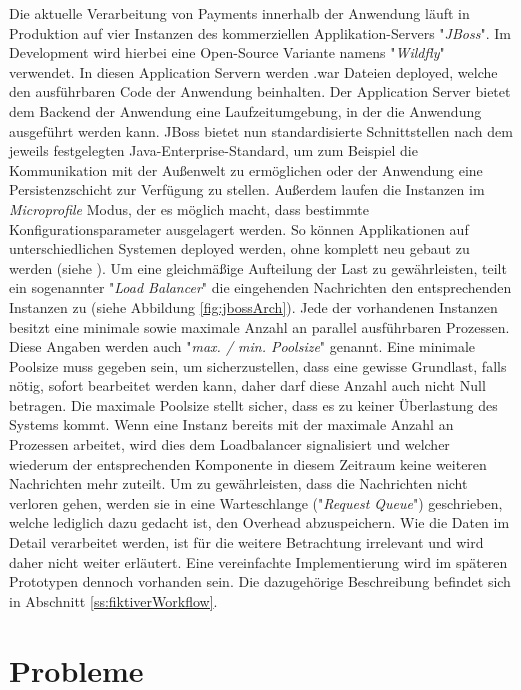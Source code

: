 Die aktuelle Verarbeitung von Payments innerhalb der Anwendung läuft in Produktion auf vier Instanzen des kommerziellen Applikation-Servers "\emph{JBoss}". Im Development wird hierbei eine Open-Source Variante namens "\emph{Wildfly}" verwendet. In diesen Application Servern werden .war Dateien deployed, welche den ausführbaren Code der Anwendung beinhalten. Der Application Server bietet dem Backend der Anwendung eine Laufzeitumgebung, in der die Anwendung ausgeführt werden kann. JBoss bietet nun standardisierte Schnittstellen nach dem jeweils festgelegten Java-Enterprise-Standard, um zum Beispiel die Kommunikation mit der Außenwelt zu ermöglichen oder der Anwendung eine Persistenzschicht zur Verfügung zu stellen. Außerdem laufen die Instanzen im \emph{Microprofile} Modus, der es möglich macht, dass bestimmte Konfigurationsparameter ausgelagert werden. So können Applikationen auf unterschiedlichen Systemen deployed werden, ohne komplett neu gebaut zu werden (siehe \cite{microprofile}). Um eine gleichmäßige Aufteilung der Last zu gewährleisten, teilt ein sogenannter "\emph{Load Balancer}" die eingehenden Nachrichten den entsprechenden Instanzen zu (siehe Abbildung \ref{fig:jbossArch}). Jede der vorhandenen Instanzen besitzt eine minimale sowie maximale Anzahl an parallel ausführbaren Prozessen. Diese Angaben werden auch "\emph{max. / min. Poolsize}" genannt. Eine minimale Poolsize muss gegeben sein, um sicherzustellen, dass eine gewisse Grundlast, falls nötig, sofort bearbeitet werden kann, daher darf diese Anzahl auch nicht Null betragen. Die maximale Poolsize stellt sicher, dass es zu keiner Überlastung des Systems kommt. Wenn eine Instanz bereits mit der maximale Anzahl an Prozessen arbeitet, wird dies dem Loadbalancer signalisiert und welcher wiederum der entsprechenden Komponente in diesem Zeitraum keine weiteren Nachrichten mehr zuteilt. Um zu gewährleisten, dass die Nachrichten nicht verloren gehen, werden sie in eine Warteschlange ("\emph{Request Queue}") geschrieben, welche lediglich dazu gedacht ist, den Overhead abzuspeichern. Wie die Daten im Detail verarbeitet werden, ist für die weitere Betrachtung irrelevant und wird daher nicht weiter erläutert. Eine vereinfachte Implementierung wird im späteren Prototypen dennoch vorhanden sein. Die dazugehörige Beschreibung befindet sich in Abschnitt \ref{ss:fiktiverWorkflow}.


\section{Probleme \checkmark \checkmark}

